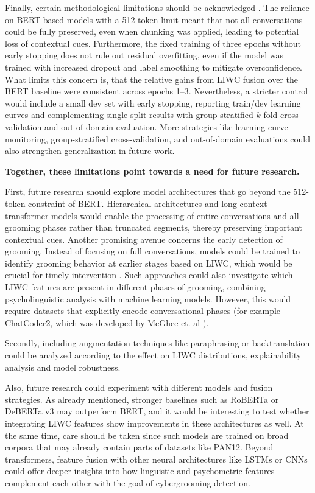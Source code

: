 Finally, certain methodological limitations should be acknowledged . The reliance on BERT-based models with a 512-token limit meant that not all conversations could be fully preserved, even when chunking was applied, leading to potential loss of contextual cues. Furthermore, the fixed training of three epochs without early stopping does not rule out residual overfitting, even if the model was trained with increased dropout and label smoothing to mitigate overconfidence. What limits this concern is, that the relative gains from LIWC fusion over the BERT baseline were consistent across epochs 1–3. Nevertheless, a stricter control would include a small dev set with early stopping, reporting train/dev learning curves and complementing single-split results with group-stratified $k$-fold cross-validation and out-of-domain evaluation. More strategies like learning-curve monitoring, group-stratified cross-validation, and out-of-domain evaluations could also strengthen generalization in future work.  

\textbf{Together, these limitations point towards a need for future research.}

First, future research should explore model architectures that go beyond the 512-token constraint of BERT. Hierarchical architectures and long-context transformer models would enable the processing of entire conversations and all grooming phases rather than truncated segments, thereby preserving important contextual cues. \cite{vogt2021early} Another promising avenue concerns the early detection of grooming. Instead of focusing on full conversations, models could be trained to identify grooming behavior at earlier stages based on LIWC, which would be crucial for timely intervention \cite{vogt2021early}. Such approaches could also investigate which LIWC features are present in different phases of grooming, combining psycholinguistic analysis with machine learning models. However, this would require datasets that explicitly encode conversational phases (for example ChatCoder2, which was developed by McGhee et. al \cite{chatcoder}). 

Secondly, including augmentation techniques like paraphrasing or backtranslation could be analyzed according to the effect on LIWC distributions, explainability analysis and model robustness. 

Also, future research could experiment with different models and fusion strategies. As already mentioned, stronger baselines such as RoBERTa \cite{liu2019roberta} or DeBERTa v3 \cite{he2023debertav3} may outperform BERT, and it would be interesting to test whether integrating LIWC features show improvements in these architectures as well. At the same time, care should be taken since such models are trained on broad corpora that may already contain parts of datasets like PAN12. Beyond transformers, feature fusion with other neural architectures like LSTMs or CNNs could offer deeper insights into how linguistic and psychometric features complement each other with the goal of cybergrooming detection.  

